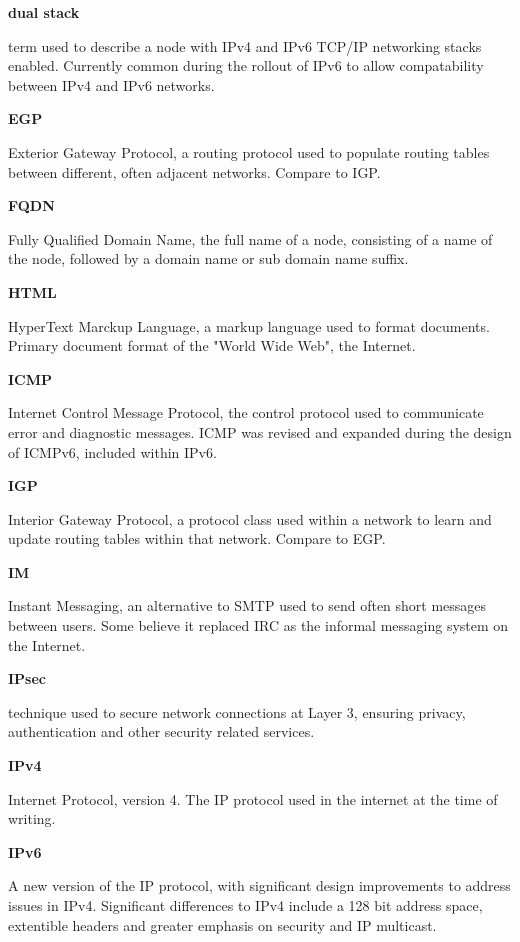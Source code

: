 \textbf{dual stack}

term used to describe a node with IPv4 and IPv6 TCP/IP networking stacks
enabled. Currently common during the rollout of IPv6 to allow
compatability between IPv4 and IPv6 networks.

\textbf{EGP}

Exterior Gateway Protocol, a routing protocol used to populate routing
tables between different, often adjacent networks. Compare to IGP.

\textbf{FQDN}

Fully Qualified Domain Name, the full name of a node, consisting of a
name of the node, followed by a domain name or sub domain name suffix.

\textbf{HTML}

HyperText Marckup Language, a markup language used to format documents.
Primary document format of the "World Wide Web", the Internet.

\textbf{ICMP}

Internet Control Message Protocol, the control protocol used to
communicate error and diagnostic messages. ICMP was revised and expanded 
during the design of ICMPv6, included within IPv6.

\textbf{IGP}

Interior Gateway Protocol, a protocol class used within a network to
learn and update routing tables within that network. Compare to EGP.

\textbf{IM}

Instant Messaging, an alternative to SMTP used to send often short
messages between users. Some believe it replaced IRC as the informal
messaging system on the Internet. 

\textbf{IPsec}

technique used to secure network connections at Layer 3, ensuring
privacy, authentication and other security related services. 

\textbf{IPv4}

Internet Protocol, version 4. The IP protocol used in the internet
at the time of writing.

\textbf{IPv6}

A new version of the IP protocol, with significant design improvements
to address issues in IPv4. Significant differences to IPv4 include a
128 bit address space, extentible headers and greater emphasis on 
security and IP multicast.

